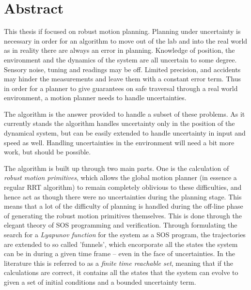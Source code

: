 \chapter{Abstract}

\abstractintoc %


  This thesis if focused on robust motion planning. Planning under uncertainty
  is necessary in order for an algorithm to move out of the lab and into the
  real world as in reality there are always an error in planning. Knowledge of
  position, the environment and the dynamics of the system are all uncertain to
  some degree. Sensory noise, tuning and readings may be off. Limited precision,
  and accidents may hinder the measurements and leave them with a constant error
  term. Thus in order for a planner to give guarantees on safe traversal through
  a real world environment, a motion planner needs to handle uncertainties.

  The \rrtfunnel{} algorithm is the answer provided to handle a subset of these
  problems. As it currently stands the algorithm handles uncertainty only in the
  position of the dynamical system, but can be easily extended to handle
  uncertainty in input and speed as well. Handling uncertainties in the
  environment will need a bit more work, but should be possible.

  The algorithm is built up through two main parts. One is the calculation of
  \textit{robust motion primitives}, which allows the global motion planner (in
  essence a regular \ac{RRT} algorithm) to remain completely oblivious to these
  difficulties, and hence act as though there were no uncertainties during the
  planning stage. This means that a lot of the difficulty of planning is handled
  during the off-line phase of generating the robust motion primitives
  themselves. This is done through the elegant theory of \ac{SOS} programming
  and verification. Through formulating the search for a \textit{Lyapunov
    function} for the system as a \ac{SOS} program, the trajectories are
  extended to so called 'funnels', which encorporate all the states the system
  can be in during a given time frame -- even in the face of uncertainties. In
  the literature this is referred to as a \textit{finite time reachable set},
  meaning that if the calculations are correct, it contains all the states that
  the system can evolve to given a set of initial conditions and a bounded
  uncertainty term.

